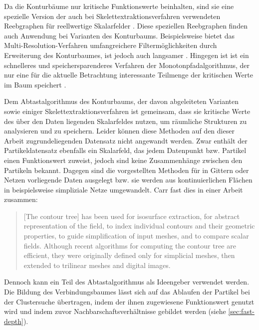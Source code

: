 
Da die Konturbäume nur kritische Funktionswerte beinhalten, sind sie eine spezielle Version der auch bei Skelettextraktionsverfahren verwendeten Reebgraphen \cite{pascucci2007computationReebGraph} für reellwertige Skalarfelder \cite[S.~44]{carr2010flexibleIsosurfaces}. Diese speziellen Reebgraphen finden auch Anwendung bei Varianten des Konturbaums. Beispielsweise bietet das Multi-Resolution-Verfahren umfangreichere Filtermöglichkeiten durch Erweiterung des Konturbaumes, ist jedoch auch langsamer \cite{pascucci2004multiResolutionComputation}. Hingegen ist ist ein schnelleres und speichersparenderes Verfahren der Monotonpfadalgorithmus, der nur eine für die aktuelle Betrachtung interessante Teilmenge der kritischen Werte im Baum speichert \cite{chiang2005contourTreesUsingMonotonePaths}.

Dem Abtastalgorithmus des Konturbaums, der davon abgeleiteten Varianten sowie einiger Skelettextraktionsverfahren ist gemeinsam, dass sie kritische Werte des über den Daten liegenden Skalarfeldes nutzen, um räumliche Strukturen zu analysieren und zu speichern. Leider können diese Methoden auf den dieser Arbeit zugrundeliegenden Datensatz nicht angewandt werden. Zwar enthält der Partikeldatensatz ebenfalls ein Skalarfeld, das jedem Datenpunkt bzw. Partikel einen Funktionswert zuweist, jedoch sind keine Zusammenhänge zwischen den Partikeln bekannt. Dagegen sind die vorgestellten Methoden für in Gittern oder Netzen vorliegende Daten ausgelegt bzw. sie werden aus kontinuierlichen Flächen in beispielsweise simpliziale Netze umgewandelt. Carr fast dies in einer Arbeit zusammen:
\blockcquote[1]{carr2009representingInterpolantTopology}{[The contour tree] has been used for isosurface extraction, for abstract representation of the field, to index individual contours and their geometric properties, to guide simplification of input meshes, and to compare scalar fields.
Although recent algorithms for computing the contour tree are efficient, they were originally defined only for simplicial meshes, then extended to trilinear meshes and digital images.}

Dennoch kann ein Teil des Abtastalgorithmus als Ideengeber verwendet werden. Die Bildung des Verbindungsbaumes lässt sich auf das Ablaufen der Partikel bei der Clustersuche übertragen, indem der ihnen zugewiesene Funktionswert genutzt wird und indem zuvor Nachbarschaftsverhältnisse gebildet werden (siehe \autoref{sec:fast-depth}).

